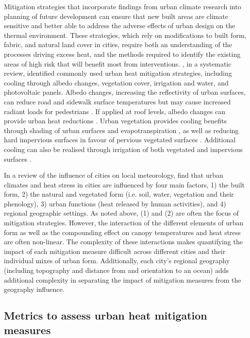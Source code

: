 \documentclass[final,3p,times,authoryear]{elsarticle}
\begin{document}
Mitigation strategies that incorporate findings from urban climate research into planning of future development can ensure that new built areas are climate sensitive and better able to address the adverse effects of urban design on the thermal environment. These strategies, which rely on modifications to built form, fabric, and natural land cover in cities, require both an understanding of the processes driving excess heat, and the methods required to identify the existing areas of high risk that will benefit most from interventions. \cite{Krayenhoff2021}, in a systematic review, identified commonly used urban heat mitigation strategies, including cooling through albedo changes, vegetation cover, irrigation and water, and photovoltaic panels. Albedo changes, increasing the reflectivity of urban surfaces, can reduce road and sidewalk surface temperatures but may cause increased radiant loads for pedestrians \citep{Middel2020}. If applied at roof levels, albedo changes can provide urban heat reductions \citep{Jacobs2018Roof}. Urban vegetation provides cooling benefits through shading of urban surfaces and evapotranspiration \citep{Bowler2010,Coutts2012,Coutts2015}, as well as reducing hard impervious surfaces in favour of pervious vegetated surfaces \citep{Middel2019a}. Additional cooling can also be realised through irrigation of both vegetated \citep{Broadbent2017a,Cheung2021} and impervious surfaces \citep{Hendel2016,Solcerova2018}.


In a review of the influence of cities on local meteorology, \cite{Masson2020a} find that urban climates and heat stress in cities are influenced by four main factors, 1) the built form, 2) the natural and vegetated form (i.e. soil, water, vegetation and their phenology), 3) urban functions (heat released by human activities), and 4) regional geographic settings. As noted above, (1) and (2) are often the focus of mitigation strategies. However, the interaction of the different elements of urban form as well as the compounding effect on canopy temperatures and heat stress are often non-linear. The complexity of these interactions makes quantifying the impact of each mitigation measure difficult across different cities and their individual mixes of urban form. Additionally, each city's regional geography (including topography and distance from and orientation to an ocean) adds additional complexity in separating the impact of mitigation measures from the geography influence. 

\subsection{Metrics to assess urban heat mitigation measures}
\end{document}

